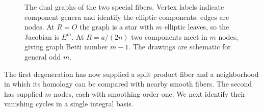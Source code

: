 \begin{figure}[tb]
\centering

\caption{The dual graphs of the two special fibers.  Vertex labels
indicate component genera and identify the elliptic components; edges
are nodes.  At $R=O$ the graph is a star with $m$ elliptic leaves, so
the Jacobian is $E^m$.  At $R=a/(2n)$ two components meet in $m$
nodes, giving graph Betti number $m-1$.  The drawings are schematic
for general odd $m$.}
\label{geo:dual-graphs}
\end{figure}

The first degeneration has now supplied a split product fiber and a
neighborhood in which its homology can be compared with nearby smooth
fibers.  The second has supplied $m$ nodes, each with smoothing order
one.  We next identify their vanishing cycles in a single integral
basis.
